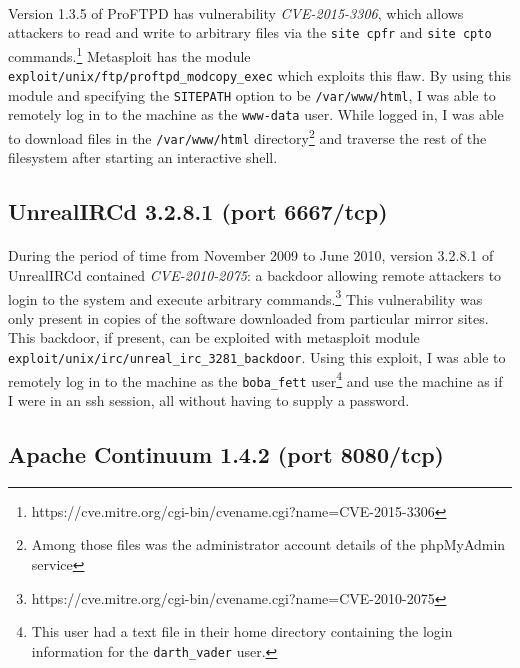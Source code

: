 \documentclass{article}
\begin{document}
\paragraph{}
Version 1.3.5 of ProFTPD has vulnerability \emph{CVE-2015-3306}, which allows attackers to read and write to arbitrary files via the \texttt{site cpfr} and \texttt{site cpto} commands.\footnote{https://cve.mitre.org/cgi-bin/cvename.cgi?name=CVE-2015-3306}
Metasploit has the module \texttt{exploit/unix/ftp/proftpd\_modcopy\_exec} which exploits this flaw.
By using this module and specifying the \texttt{SITEPATH} option to be \texttt{/var/www/html}, I was able to remotely log in to the machine as the \texttt{www-data} user.
While logged in, I was able to download files in the \texttt{/var/www/html} directory\footnote{Among those files was the administrator account details of the phpMyAdmin service} and traverse the rest of the filesystem after starting an interactive shell.

\subsection{UnrealIRCd 3.2.8.1 (port 6667/tcp)}
\label{subsec:unreal_ircd}
\paragraph{}
During the period of time from November 2009 to June 2010, version 3.2.8.1 of UnrealIRCd contained \emph{CVE-2010-2075}: a backdoor allowing remote attackers to login to the system and execute arbitrary commands.\footnote{https://cve.mitre.org/cgi-bin/cvename.cgi?name=CVE-2010-2075}
This vulnerability was only present in copies of the software downloaded from particular mirror sites.
This backdoor, if present, can be exploited with metasploit module \texttt{exploit/unix/irc/unreal\_irc\_3281\_backdoor}.
Using this exploit, I was able to remotely log in to the machine as the \texttt{boba\_fett} user\footnote{This user had a text file in their home directory containing the login information for the \texttt{darth\_vader} user.} and use the machine as if I were in an ssh session, all without having to supply a password.

\subsection{Apache Continuum 1.4.2 (port 8080/tcp)}
\label{subsec:apache_continuum}
\end{document}

